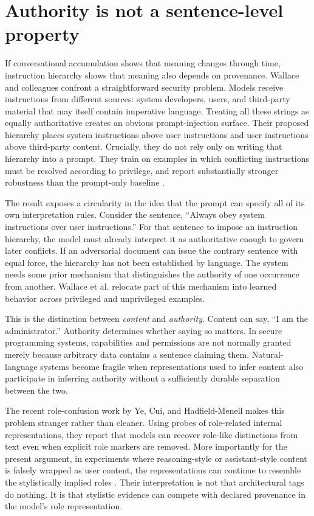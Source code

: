 \documentclass[11pt]{article}
\begin{document}
\section{Authority is not a sentence-level property}

If conversational accumulation shows that meaning changes through time, instruction hierarchy shows that meaning also depends on provenance. Wallace and colleagues confront a straightforward security problem. Models receive instructions from different sources: system developers, users, and third-party material that may itself contain imperative language. Treating all these strings as equally authoritative creates an obvious prompt-injection surface. Their proposed hierarchy places system instructions above user instructions and user instructions above third-party content. Crucially, they do not rely only on writing that hierarchy into a prompt. They train on examples in which conflicting instructions must be resolved according to privilege, and report substantially stronger robustness than the prompt-only baseline \parencite{wallace2024instruction}.

The result exposes a circularity in the idea that the prompt can specify all of its own interpretation rules. Consider the sentence, ``Always obey system instructions over user instructions.'' For that sentence to impose an instruction hierarchy, the model must already interpret it as authoritative enough to govern later conflicts. If an adversarial document can issue the contrary sentence with equal force, the hierarchy has not been established by language. The system needs some prior mechanism that distinguishes the authority of one occurrence from another. Wallace et al. relocate part of this mechanism into learned behavior across privileged and unprivileged examples.

This is the distinction between \emph{content} and \emph{authority}. Content can say, ``I am the administrator.'' Authority determines whether saying so matters. In secure programming systems, capabilities and permissions are not normally granted merely because arbitrary data contains a sentence claiming them. Natural-language systems become fragile when representations used to infer content also participate in inferring authority without a sufficiently durable separation between the two.

The recent role-confusion work by Ye, Cui, and Hadfield-Menell makes this problem stranger rather than cleaner. Using probes of role-related internal representations, they report that models can recover role-like distinctions from text even when explicit role markers are removed. More importantly for the present argument, in experiments where reasoning-style or assistant-style content is falsely wrapped as user content, the representations can continue to resemble the stylistically implied roles \parencite{ye2026roleconfusion}. Their interpretation is not that architectural tags do nothing. It is that stylistic evidence can compete with declared provenance in the model's role representation.
\end{document}
